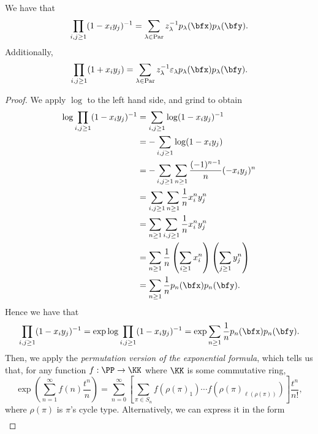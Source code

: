 \documentclass{article}
\DeclareMathOperator{\Par}{Par}
\begin{document}
\begin{theorem}\label{CauchyIdentityForPP}
    We have that
    \[
        \prod_{i,j \geq 1} (1-x_iy_j)^{-1}
        =
        \sum_{\lambda\in\Par}
        z_\lambda^{-1} p_\lambda(\bfx) p_\lambda(\bfy).
    \]
    Additionally,
    \[
        \prod_{i,j \geq 1}
        (1+x_iy_j)
        =
        \sum_{\lambda\in\Par}
        z_\lambda^{-1}\varepsilon_{\lambda} p_\lambda(\bfx) p_\lambda(\bfy).
    \]
\end{theorem}

\begin{proof}
    We apply $\log$ to the left hand side, and grind to obtain
    \begin{align*}
        \log \prod_{i,j \geq 1}
        (1-x_iy_j)^{-1}
        &=
        \sum_{i,j\geq1}
        \log(1-x_iy_j)^{-1} \\
        &=
        -\sum_{i,j \geq 1}
        \log(1-x_iy_j) \\
        &=
        -\sum_{i,j \geq 1}
        \sum_{n\geq 1}
        \frac{(-1)^{n-1}}{n}(-x_iy_j)^n \\
        &=
        \sum_{i,j \geq 1}
        \sum_{n\geq 1}
        \frac{1}{n} x_i^ny_j^n \\
        &=
        \sum_{n \geq 1}
        \sum_{i,j\geq 1}
        \frac{1}{n} x_i^ny_j^n \\
        &=
        \sum_{n \geq 1}
        \frac{1}{n}
        \left(\sum_{i\geq1}x_i^n\right)
        \left(\sum_{j\geq1}y_j^n\right) \\
        &=
        \sum_{n \geq 1}
        \frac{1}{n} p_n(\bfx) p_n(\bfy).
    \end{align*}
    Hence we have that
    \[
        \prod_{i,j\geq1}(1-x_iy_j)^{-1} 
        = 
        \exp \log \prod_{i,j\geq1}(1-x_iy_j)^{-1} 
        = 
        \exp \sum_{n \geq 1} 
        \frac{1}{n} p_n(\bfx) p_n(\bfy).
    \]
    Then, we apply the \textit{permutation version of the exponential formula}, which tells us that, for any function $f: \PP \to \KK$ where $\KK$ is some commutative ring,
    \[
        \exp
        \left(
            \sum_{n=1}^\infty
            f(n)
            \frac{t^n}{n}
        \right)
        =
        \sum_{n=0}^\infty
        \left[
            \sum_{
                \pi \in S_n
            }
            f(\rho(\pi)_1) \cdots f(\rho(\pi)_{\ell(\rho(\pi))})
        \right]
        \frac{t^n}{n!},
    \]
    where $\rho(\pi)$ is $\pi$'s cycle type.
    Alternatively, we can express it in the form
    \begin{align*}

\end{align*}
\end{proof}
\end{document}
